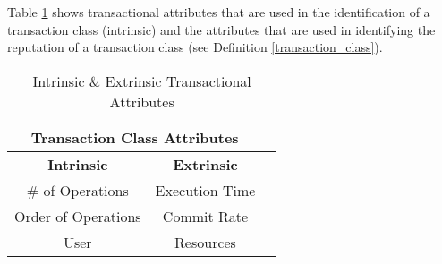 Table \ref{tbl:intrinsic_and_extrinsic_attributes} shows transactional attributes that are used in the identification of a transaction class (intrinsic) and the attributes that are used in identifying the reputation of a transaction class (see Definition \ref{transaction_class}).

\begin{table}[h]
\caption{Intrinsic \& Extrinsic Transactional Attributes}
\captionsetup{justification=centering}
\centering
\begin{tabular}{|c|c|c|}
\hline
\multicolumn{2}{|c|}{\cellcolor[HTML]{EFEFEF}\textbf{Transaction Class Attributes}}                                                   \\ \hline
\textbf{Intrinsic} & \textbf{Extrinsic}   \\ \hline
\# of Operations  &  Execution Time         \\ \hline
Order of Operations  &  Commit Rate      \\ \hline
User             & Resources            \\ \hline
\end{tabular}
\label{tbl:intrinsic_and_extrinsic_attributes}

\end{table}